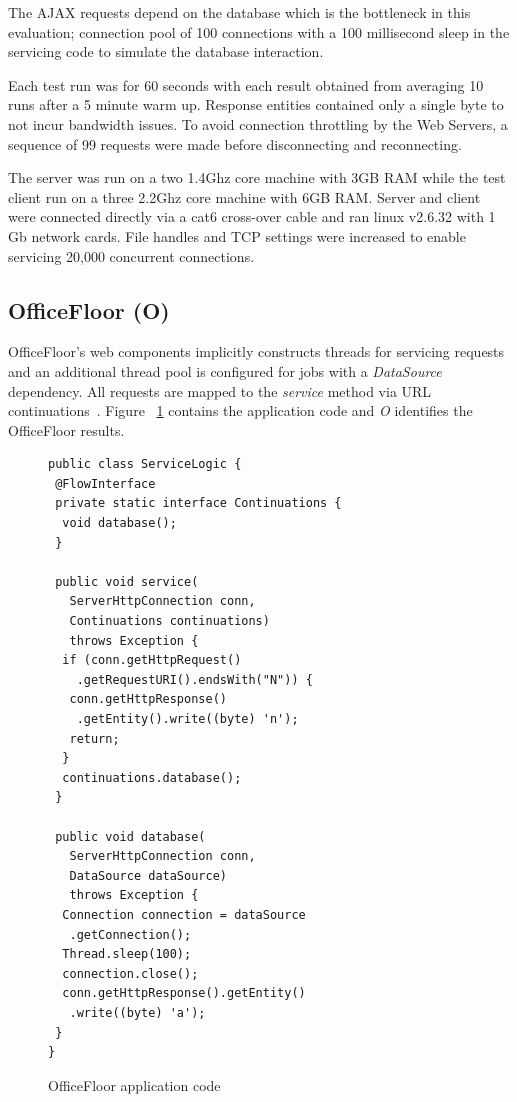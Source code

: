 \documentclass[conference]{ieee/IEEEtran}
\begin{document}
The AJAX requests depend on the database which is the bottleneck in this
evaluation; connection pool of 100 connections with a 100 millisecond sleep in
the servicing code to simulate the database interaction.

Each test run was for 60 seconds with each result obtained from averaging 10
runs after a 5 minute warm up.  Response entities contained only a single byte
to not incur bandwidth issues.  To avoid connection throttling by the Web
Servers, a sequence of 99 requests were made before disconnecting and
reconnecting.

The server was run on a two 1.4Ghz core machine with 3GB RAM while the test
client run on a three 2.2Ghz core machine with 6GB RAM.  Server and client were
connected directly via a cat6 cross-over cable and ran linux v2.6.32 with 1 Gb
network cards.  File handles and TCP settings were increased to enable servicing
20,000 concurrent connections.

\subsection{OfficeFloor (O)}
OfficeFloor's web components implicitly constructs threads for servicing
requests and an additional thread pool is configured for jobs with a
\textit{DataSource} dependency.  All requests are mapped to the \textit{service}
method via URL continuations~\cite{url-continuation}.  Figure
~\ref{fig:officefloor_code} contains the application code and \textit{O}
identifies the OfficeFloor results.

\begin{figure}[!t]
\begin{verbatim}
public class ServiceLogic {
 @FlowInterface
 private static interface Continuations {
  void database();
 }

 public void service(
   ServerHttpConnection conn, 
   Continuations continuations) 
   throws Exception { 
  if (conn.getHttpRequest()
    .getRequestURI().endsWith("N")) {
   conn.getHttpResponse()
    .getEntity().write((byte) 'n');
   return;
  }
  continuations.database();
 }

 public void database(
   ServerHttpConnection conn,
   DataSource dataSource) 
   throws Exception {
  Connection connection = dataSource
   .getConnection();
  Thread.sleep(100);
  connection.close();
  conn.getHttpResponse().getEntity()
   .write((byte) 'a');
 }
}
\end{verbatim}
\caption{OfficeFloor application code}
\label{fig:officefloor_code}
\end{figure}
\end{document}
